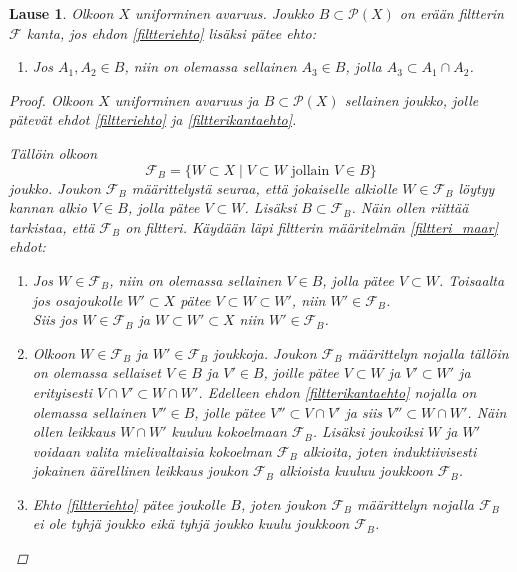 \documentclass[12pt,a4paper,leqno]{report}
\newcommand{\U}{\,\mathcal{U}}
\newcommand{\Pot}{\mathcal{P}}
\newcommand{\F}{\mathcal{F}}
\theoremstyle{plain}
\newtheorem{lause}[equation]{Lause}
\theoremstyle{definition}
\theoremstyle{remark}
\begin{document}
\begin{lause}
Olkoon $X$ uniforminen avaruus. Joukko $B\subset\Pot(X)$ on erään filtterin $\F$ kanta, 
jos ehdon \ref{filtteriehto} lisäksi pätee ehto: 
\begin{enumerate} [label=($B_F$),ref=($B_F$)]
\item\label{filtterikantaehto} Jos $A_1,A_2\in B$, niin on olemassa sellainen $A_3\in B$, 
jolla $A_3\subset A_1\cap A_2$.
\end{enumerate}
\begin{proof}
Olkoon $X$ uniforminen avaruus ja $B\subset\Pot(X)$ sellainen joukko, 
jolle pätevät ehdot \ref{filtteriehto} ja \ref{filtterikantaehto}.

Tällöin olkoon 
$$\F_B=\{W\subset X\mid V\subset W\text{ jollain } V\in B\}$$ 
joukko. 
Joukon $\F_B$ määrittelystä seuraa, 
että jokaiselle alkiolle $W\in\F_B$ löytyy 
kannan alkio $V\in B$, jolla pätee $V\subset W$. 
Lisäksi $ B\subset\F_B$.
Näin ollen riittää tarkistaa, että $\F_B$ on filtteri. 
Käydään läpi filtterin määritelmän \ref{filtteri_maar} ehdot:
\begin{enumerate} 
\item[\ref{F_I}] 
Jos $W\in \F_B$, niin on olemassa sellainen $V\in B$, jolla pätee $V\subset W$. 
Toisaalta jos osajoukolle $W'\subset X$ pätee $V\subset W \subset W'$, 
niin $W'\in\F_B$. \\
Siis jos $W\in \F_B$ ja $W\subset W'\subset X$ niin $ W'\in\F_B$.
\item[\ref{F_II}] Olkoon $W\in\F_B$ ja $W'\in\F_B$ joukkoja. 
Joukon $\F_B$ määrittelyn nojalla tällöin on olemassa 
sellaiset $V\in B$ ja $V'\in B$, 
joille pätee $V\subset W$ ja $V'\subset W'$ ja 
erityisesti $V\cap V'\subset W\cap W'$. 
Edelleen ehdon \ref{filtterikantaehto} nojalla on olemassa sellainen $V''\in B$, 
jolle pätee $V''\subset V\cap V'$ ja siis $V''\subset W\cap W'$. 
Näin ollen leikkaus $W\cap W'$ kuuluu kokoelmaan $\F_B$. 
Lisäksi joukoiksi $W$ ja $W'$ voidaan valita mielivaltaisia kokoelman $\F_B$ alkioita, 
joten induktiivisesti jokainen äärellinen leikkaus joukon $\F_B$ alkioista kuuluu joukkoon $\F_B$.
\item[\ref{filtteriehto}] Ehto \ref{filtteriehto} pätee joukolle $B$, joten joukon $\F_B$ määrittelyn nojalla $\F_B$ ei ole tyhjä joukko eikä tyhjä joukko kuulu joukkoon $\F_B$.
\end{enumerate}
\end{proof}
\end{lause}
\end{document}
